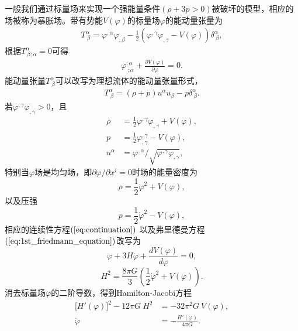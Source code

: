 一般我们通过标量场来实现一个强能量条件$(\rho+3p >
0)$被破坏的模型，相应的场被称为暴胀场。带有势能$V(\varphi)$的标量场$\varphi$的能动量张量为
\begin{align}
  \label{eq:scalar-energy-momentum-tensor}
  T^{\alpha}_{\ \beta} = \varphi^{,\alpha}\varphi_{,\beta}-
  \frac{1}{2}{\left(\varphi^{,\gamma}\varphi_{,\gamma}-V(\varphi)\right)}\delta^{\alpha}_{\
  \beta},
\end{align}
根据$T^{\alpha}_{\ \beta;\alpha}=0$可得
\begin{align}
  \varphi^{;\alpha}_{\ ;\alpha}+\frac{\partial V(\varphi)}{\partial\varphi}
  =0.
\end{align}
能动量张量$T^{\alpha}_{\
\beta}$可以改写为理想流体的能动量张量形式，
\begin{align}
  \label{eq:perfect-fluid-energy-momentum-tensor}
  T^{\alpha}_{\ \beta}=(\rho+p)u^{\alpha}u_{\beta}-p\delta^{\alpha}_{\
  \beta}.
\end{align}
若$\varphi^{,\gamma}\varphi_{,\gamma}>0$，且
\begin{align}
  \rho &= \frac{1}{2}\varphi^{,\gamma}\varphi_{,\gamma}+V(\varphi),\\
  p&= \frac{1}{2}\varphi^{,\gamma}_{,\gamma}-V(\varphi), \\
  u^{\alpha}&= \varphi^{,\alpha}/
  \sqrt{\varphi^{,\gamma}\varphi_{,\gamma}},
\end{align}
特别当$\varphi$场是均匀场，即$\partial\varphi /\partial x^{i}=0$时场的能量密度为
\begin{equation}\label{eq:energy_density}
  \rho = \frac{1}{2}\dot{\varphi}^2+V(\varphi),
\end{equation}
以及压强
\begin{equation}\label{eq:pressure}
  p=\frac{1}{2}\dot{\varphi}^2-V(\varphi),
\end{equation}
相应的连续性方程$(\ref{eq:continuation})$
以及弗里德曼方程$(\ref{eq:1st_friedmann_equation})$改写为
\begin{equation}
  \label{eq:continuation_in_inflation}
  \ddot{\varphi}+3H\dot\varphi+\frac{dV(\varphi)}{d\varphi}=0,
\end{equation}
\begin{equation}
  \label{eq:1st_friedmann_equation_in_inflation}
  H^2=\frac{8\pi G}{3}\left(\frac{1}{2}\dot\varphi^2+V(\varphi)\right).
\end{equation}
消去标量场$\varphi$的二阶导数，得到Hamilton-Jacobi方程
\begin{align}
  \lbrack H'(\varphi)\rbrack^2 - 12\pi G\ H^2 &=
  -32\pi^2G\ V(\varphi)\label{HJa}, \\
  \dot\varphi  &= -\frac{H'(\varphi)}{4\pi G}\label{HJb}.
\end{align}

